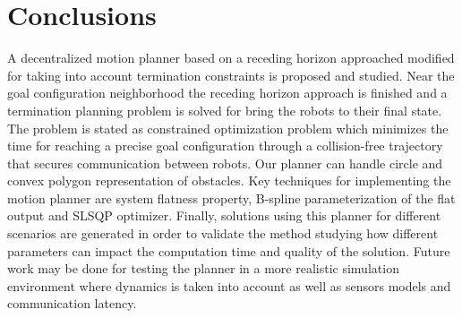 \documentclass[eprint]{actapoly}
\begin{document}
%

\section{Conclusions}

A decentralized motion planner based on a receding horizon approached modified for taking into account 
termination constraints is proposed and studied. Near the goal configuration 
neighborhood the receding horizon approach is finished and a termination planning 
problem is solved for bring the robots to their final state.
The problem is stated as constrained optimization problem which minimizes the time 
for reaching a precise goal configuration through a collision-free trajectory that 
secures communication between robots. Our planner can handle circle and convex polygon representation of obstacles.
Key techniques for implementing the motion planner are system flatness property, 
B-spline parameterization of the flat output and SLSQP optimizer.
Finally, solutions using this planner for different scenarios are generated in 
order to validate the method studying how different parameters can impact the 
computation time and quality of the solution. 
Future work may be done for testing the planner in a more realistic simulation environment where dynamics is taken into account as well as sensors models and communication latency.




%




\end{document}

